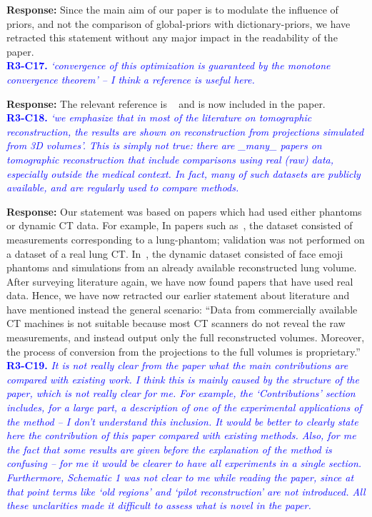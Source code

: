 \documentclass{article}
\begin{document}
\textbf{Response:} Since the main aim of our paper is to modulate the influence of priors, and not the comparison of global-priors with dictionary-priors, we have retracted this statement without any major impact in the readability of the paper. \\

\textcolor{blue}{\textbf{R3-C17.}\textit{ `convergence of this optimization is guaranteed by the monotone convergence theorem' -- I think a reference is useful here.}}

\textbf{Response:} The relevant reference is ~\cite{monotone} and is now included in the paper.\\

\textcolor{blue}{\textbf{R3-C18.}\textit{ `we emphasize that in most of the literature on tomographic reconstruction, the results are shown on reconstruction from projections simulated from 3D volumes'. This is simply not true: there are \_many\_ papers on tomographic reconstruction that include comparisons using real (raw) data, especially outside the medical context. In fact, many of such datasets are publicly available, and are regularly used to compare methods.}}

\textbf{Response:} Our statement was based on papers which had used either phantoms or dynamic CT data. For example, In papers such as~\cite{pirple}, the dataset consisted of measurements corresponding to a lung-phantom; validation was not performed on a dataset of a real lung CT. In~\cite{Hakka2019}, the dynamic dataset consisted of face emoji phantoms and simulations from an already available reconstructed lung volume. After surveying literature again, we have now found papers that have used real data. Hence,  we have now retracted our earlier statement about literature and have mentioned instead the general scenario: ``Data from commercially available CT machines is not suitable because most CT scanners do not reveal the raw measurements, and instead output only the full reconstructed volumes. Moreover, the process of conversion from the  projections to the full volumes is proprietary.'' \\

\textcolor{blue}{\textbf{R3-C19.}\textit{ It is not really clear from the paper what the main contributions are compared with existing work. I think this is mainly caused by the structure of the paper, which is not really clear for me. For example, the `Contributions' section includes, for a large part, a description of one of the experimental applications of the method -- I don't understand this inclusion. It would be better to clearly state here the contribution of this paper compared with existing methods. Also, for me the fact that some results are given before the explanation of the method is confusing -- for me it would be clearer to have all experiments in a single section. Furthermore, Schematic 1 was not clear to me while reading the paper, since at that point terms like `old regions' and `pilot reconstruction' are not introduced. All these unclarities made it difficult to assess what is novel in the paper.}}
\end{document}
